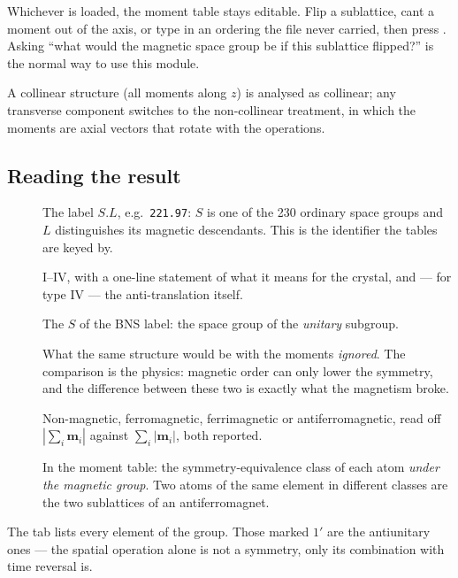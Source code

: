 Whichever is loaded, the moment table stays editable. Flip a sublattice, cant
a moment out of the axis, or type in an ordering the file never carried, then
press . Asking ``what would the magnetic space group be if this
sublattice flipped?'' is the normal way to use this module.

A collinear structure (all moments along $z$) is analysed as collinear; any
transverse component switches to the non-collinear treatment, in which the
moments are axial vectors that rotate with the operations.

\subsection{Reading the result}

\begin{description}
  \item[] The label $S.L$, e.g.\ \texttt{221.97}: $S$ is one
    of the 230 ordinary space groups and $L$ distinguishes its magnetic
    descendants. This is the identifier the tables are keyed by.
  \item[] I--IV, with a one-line statement of what it means for the
    crystal, and --- for type IV --- the anti-translation itself.
  \item[] The $S$ of the BNS label: the space group of
    the \emph{unitary} subgroup.
  \item[] What the same structure would be
    with the moments \emph{ignored}. The comparison is the physics: magnetic
    order can only lower the symmetry, and the difference between these two
    is exactly what the magnetism broke.
  \item[] Non-magnetic, ferromagnetic, ferrimagnetic or
    antiferromagnetic, read off $|\sum_i \mathbf{m}_i|$ against
    $\sum_i |\mathbf{m}_i|$, both reported.
  \item[] In the moment table: the symmetry-equivalence
    class of each atom \emph{under the magnetic group}. Two atoms of the same
    element in different classes are the two sublattices of an
    antiferromagnet.
\end{description}

The  tab lists every element of the group. Those
marked $1'$ are the antiunitary ones --- the spatial operation alone is not a
symmetry, only its combination with time reversal is.

